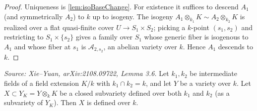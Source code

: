 \begin{proof}
  Uniqueness is \cref{lem:isoBaseChange}.
  For existence it suffices to descend \(A_1\) (and symmetrically \(A_2\)) to \(k\) up to
  isogeny.  The isogeny \(A_1 \otimes_{k_1} K \sim A_2 \otimes_{k_2} K\) is realized over a
  flat quasi-finite cover \(U \to S_1 \times S_2\); picking a \(k\)-point \((s_1,s_2)\)
  and restricting to \(S_1 \times \{s_2\}\) gives a family over \(S_1\) whose generic fiber
  is isogenous to \(A_1\) and whose fiber at \(s_1\) is \(\mathcal{A}_{2,s_2}\), an abelian
  variety over \(k\).  Hence \(A_1\) descends to \(k\).
\end{proof}

\begin{lemma}
  \label{lem:subvarDef}
  \uses{}
  \textit{Source: Xie--Yuan, arXiv:2108.09722, Lemma 3.6.}
  Let \(k_1, k_2\) be intermediate fields of a field extension \(K/k\) with
  \(k_1 \cap k_2 = k\), and let \(Y\) be a variety over \(k\).
  Let \(X \subset Y_K = Y \otimes_k K\) be a closed subvariety defined over both \(k_1\) and
  \(k_2\) (as a subvariety of \(Y_K\)).  Then \(X\) is defined over \(k\).
\end{lemma}

